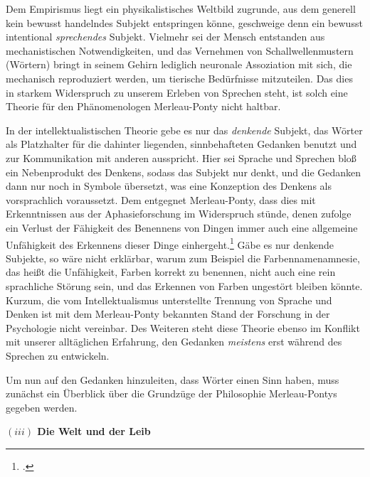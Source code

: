 \documentclass[a4paper, 12pt]{article}
\begin{document}
\begin{onehalfspace}
Dem Empirismus liegt ein physikalistisches Weltbild zugrunde, aus dem generell kein bewusst handelndes Subjekt entspringen könne, geschweige denn ein bewusst intentional \emph{sprechendes} Subjekt. Vielmehr sei der Mensch entstanden aus mechanistischen Notwendigkeiten, und das Vernehmen von Schallwellenmustern (Wörtern) bringt in seinem Gehirn lediglich neuronale Assoziation mit sich, die mechanisch reproduziert werden, um tierische Bedürfnisse mitzuteilen. Das dies in starkem Widerspruch zu unserem Erleben von Sprechen steht, ist solch eine Theorie für den Phänomenologen Merleau-Ponty nicht haltbar.

In der intellektualistischen Theorie gebe es nur das \emph{denkende} Subjekt, das Wörter als Platzhalter für die dahinter liegenden, sinnbehafteten Gedanken benutzt und zur Kommunikation mit anderen ausspricht. Hier sei Sprache und Sprechen bloß ein Nebenprodukt des Denkens, sodass das Subjekt nur denkt, und die Gedanken dann nur noch in Symbole übersetzt, was eine Konzeption des Denkens als vorsprachlich voraussetzt. Dem entgegnet Merleau-Ponty, dass dies mit Erkenntnissen aus der Aphasieforschung im Widerspruch stünde, denen zufolge ein Verlust der Fähigkeit des Benennens von Dingen immer auch eine allgemeine Unfähigkeit des Erkennens dieser Dinge einhergeht.\footnote{\Cite[Vgl.][S. 208 f.]{merleau1966phanomenologie}.} Gäbe es nur denkende Subjekte, so wäre nicht erklärbar, warum zum Beispiel die Farbennamenamnesie, das heißt die Unfähigkeit, Farben korrekt zu benennen, nicht auch eine rein sprachliche Störung sein, und das Erkennen von Farben ungestört bleiben könnte. Kurzum, die vom Intellektualismus unterstellte Trennung von Sprache und Denken ist mit dem Merleau-Ponty bekannten Stand der Forschung in der Psychologie nicht vereinbar. Des Weiteren steht diese Theorie ebenso im Konflikt mit unserer alltäglichen Erfahrung, den Gedanken \emph{meistens} erst während des Sprechen zu entwickeln.

Um nun auf den Gedanken hinzuleiten, dass Wörter einen Sinn haben, muss zunächst ein Überblick über die Grundzüge der Philosophie Merleau-Pontys gegeben werden.

\vspace{5mm}

\noindent\textbf{$(iii)$ Die Welt und der Leib}


\end{onehalfspace}
\end{document}
